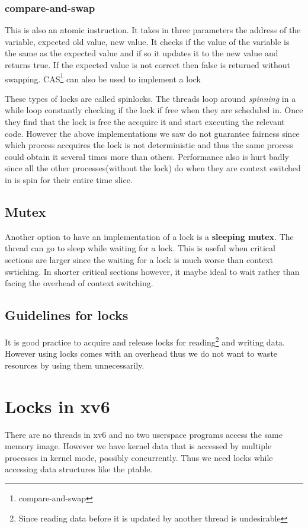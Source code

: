 \documentclass[12pt]{article}
\newcommand{\tbox}[1]{\noindent\fbox{\parbox{\textwidth}{#1}}}
\begin{document}
\subsubsection*{compare-and-swap}
This is also an atomic instruction. It takes in three parameters the address of the variable, expected old value, new value. 
It checks if the value of the variable is the same as the expected value and if so it updates it to the new value and returns true.
If the expected value is not correct then false is returned without swapping. CAS\footnote{compare-and-swap} can also be used to implement a lock

These types of locks are called spinlocks. The threads loop around \textit{spinning} in a while loop constantly checking if the lock if free when they are scheduled in. Once they find that
the lock is free the accquire it and start executing the relevant code. However the above implementations we saw do not guarantee fairness since which process accquires the lock is not deterministic and thus the same process could obtain it several times more 
than others. Performance also is hurt badly since all the other processes(without the lock) do when they are context switched in is spin for their entire time slice. 

\subsection{Mutex}
Another option to have an implementation of a lock is a \textbf{sleeping mutex}. The thread can go to sleep while waiting for a lock.
This is useful when critical sections are larger since the waiting for a lock is much worse than context swtiching. In shorter critical sections however, it maybe ideal to wait rather 
than facing the overhead of context switching. 
\newpage
\noindent\tbox{
    \begin{center}
    \textbf{\Huge Lecture 23}
    \end{center}
}
\subsection{Guidelines for locks}
It is good practice to acquire and release locks for reading\footnote{Since reading data before it is updated by another thread is undesirable} and writing data. However using locks comes with an overhead thus we do not want to waste 
resources by using them unnecessarily. 


\section{Locks in xv6}
There are no threads in xv6 and no two userspace programs 
access the same memory image. However we have kernel data that is accessed by multiple processes in kernel mode, possibly concurrently.
Thus we need locks while accessing data structures like the ptable.
\end{document}
